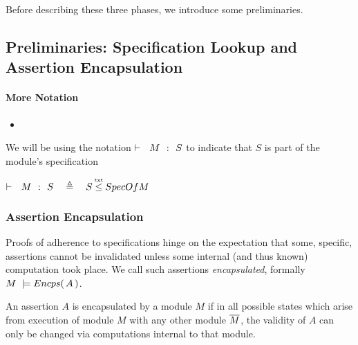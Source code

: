\vspace{.1cm}
Before describing these three phases, we introduce some preliminaries.


\subsection{Preliminaries: Specification Lookup and  Assertion Encapsulation}

\paragraph{More Notation} 
 \begin{itemize}
 \item
\end{itemize}

We will be using the notation ${\vdash \ \ M\ \ \mathbf{:}\ \ S}$ to indicate that $S$ is part of the module's specification

\begin{definition}
\label{d:encaps}
 $\promises M S\ \ \ \triangleq\ \ \ S \txtin SpecOf M  $
 \end{definition} 

\subsubsection {Assertion Encapsulation}
\label{s:encaps-proof}

{
Proofs of adherence to {\SpecLang specifications  hinge on the expectation that some, 
specific, assertions cannot be invalidated unless some 
} internal (and thus known) computation took place. 
{We call such assertions   \emph{encapsulated},}
}
formally $M\ \models  {\ensuremath Encps(\, A\, )}$.
 


{An assertion $A$  is  encapsulated by a module $M$  if in all possible states which arise from execution of module $M$ with any other  module $\overline{M}$, the validity of $A$}  {can only be changed via computations internal to that module}.
 

